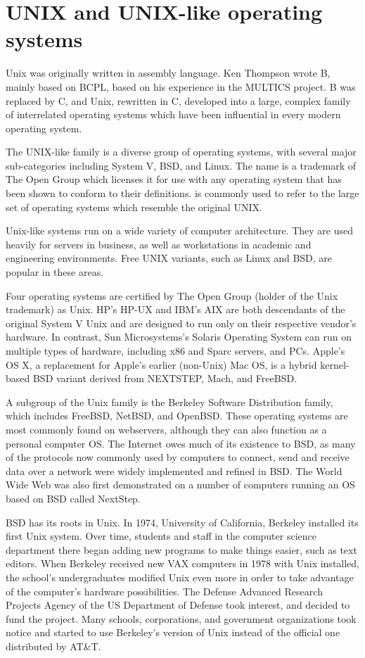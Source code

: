 \documentclass{full}
\begin{document}
\section*{UNIX and UNIX-like operating systems}

Unix was originally written in assembly language. Ken Thompson wrote B, mainly
based on BCPL, based on his experience in the MULTICS project. B was replaced by
C, and Unix, rewritten in C, developed into a large, complex family of
interrelated operating systems which have been influential in every modern
operating system.

The UNIX-like family is a diverse group of operating systems, with several major
sub-categories including System V, BSD, and Linux. The name  is a
trademark of The Open Group which licenses it for use with any operating system
that has been shown to conform to their definitions.  is
commonly used to refer to the large set of operating systems which resemble the
original UNIX.

Unix-like systems run on a wide variety of computer architecture. They are used
heavily for servers in business, as well as workstations in academic and
engineering environments. Free UNIX variants, such as Linux and BSD, are popular
in these areas.

Four operating systems are certified by The Open Group (holder of the Unix
trademark) as Unix. HP's HP-UX and IBM's AIX are both descendants of the
original System V Unix and are designed to run only on their respective vendor's
hardware. In contrast, Sun Microsystems's Solaris Operating System can run on
multiple types of hardware, including x86 and Sparc servers, and PCs. Apple's OS
X, a replacement for Apple's earlier (non-Unix) Mac OS, is a hybrid kernel-based
BSD variant derived from NEXTSTEP, Mach, and FreeBSD.

A subgroup of the Unix family is the Berkeley Software Distribution family,
which includes FreeBSD, NetBSD, and OpenBSD. These operating systems are most
commonly found on webservers, although they can also function as a personal
computer OS. The Internet owes much of its existence to BSD, as many of the
protocols now commonly used by computers to connect, send and receive data over
a network were widely implemented and refined in BSD. The World Wide Web was
also first demonstrated on a number of computers running an OS based on BSD
called NextStep.

BSD has its roots in Unix. In 1974, University of California, Berkeley installed
its first Unix system. Over time, students and staff in the computer science
department there began adding new programs to make things easier, such as text
editors. When Berkeley received new VAX computers in 1978 with Unix installed,
the school's undergraduates modified Unix even more in order to take advantage
of the computer's hardware possibilities. The Defense Advanced Research Projects
Agency of the US Department of Defense took interest, and decided to fund the
project. Many schools, corporations, and government organizations took notice
and started to use Berkeley's version of Unix instead of the official one
distributed by AT\&T.
\end{document}
